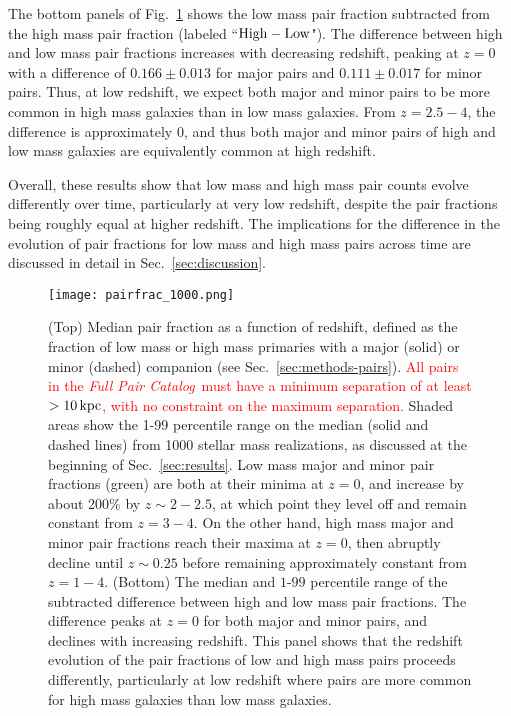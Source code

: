 \documentclass[twocolumn]{aastex631}
\newcommand{\add}[1]{\textcolor{red}{#1}}
\newcommand{\paircat}{\textit{Full Pair Catalog}}
\begin{document}
    The bottom panels of Fig.~\ref{fig:pairfrac} shows the low mass pair fraction subtracted from the high mass pair fraction (labeled ``$\rm High-Low$").
    The difference between high and low mass pair fractions increases with decreasing redshift, peaking at $z=0$ with a difference of $0.166\pm0.013$ for major pairs and $0.111\pm0.017$ for minor pairs. 
    Thus, at low redshift, we expect both major and minor pairs to be more common in high mass galaxies than in low mass galaxies. 
    From $z=2.5-4$, the difference is approximately 0, and thus both major and minor pairs of high and low mass galaxies are equivalently common at high redshift. 
    
    Overall, these results show that low mass and high mass pair counts evolve differently over time, particularly at very low redshift, despite the pair fractions being roughly equal at higher redshift. 
    The implications for the difference in the evolution of pair fractions for low mass and high mass pairs across time are discussed in detail in Sec.~\ref{sec:discussion}.
    
    \begin{figure*}[htp]
      \centering
      \texttt{[image: pairfrac\_1000.png]}
      \caption{%
        (Top) Median pair fraction as a function of redshift, defined as the fraction of low mass or high mass primaries with a major (solid) or minor (dashed) companion  (see Sec.~\ref{sec:methods-pairs}). \add{All pairs in the \paircat\ must have a minimum separation of at least $>10\mathrm{\,kpc}$, with no constraint on the maximum separation.}
        Shaded areas show the 1-99 percentile range on the median (solid and dashed lines) from 1000 stellar mass realizations, as discussed at the beginning of Sec.~\ref{sec:results}. 
        Low mass major and minor pair fractions (green) are both at their minima at $z=0$, and increase by about 200\% by $z\sim2-2.5$, at which point they level off and remain constant from $z=3-4$. 
        On the other hand, high mass major and minor pair fractions reach their maxima at $z=0$, then abruptly decline until $z\sim0.25$ before remaining approximately constant from $z=1-4$. 
        (Bottom) The median and $1$-$99$ percentile range of the subtracted difference between high and low mass pair fractions. 
        The difference peaks at $z=0$ for both major and minor pairs, and declines with increasing redshift.
        This panel shows that the redshift evolution of the pair fractions of low and high mass pairs proceeds differently, particularly at low redshift where pairs are more common for high mass galaxies than low mass galaxies.}
      \label{fig:pairfrac}
    \end{figure*}
\end{document}
